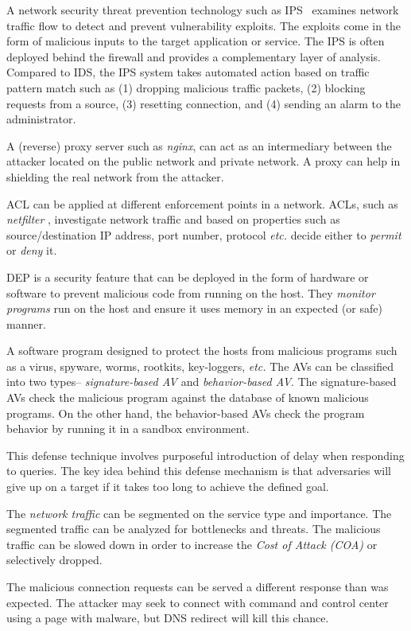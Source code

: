 A network security threat prevention technology such as IPS~ examines network traffic flow to detect and prevent vulnerability exploits. The exploits come in the form of malicious inputs to the target application or service. The IPS is often  deployed behind the firewall and provides a complementary layer of analysis. Compared to IDS, the IPS system takes automated action based on traffic pattern match such as (1) dropping malicious traffic packets, (2) blocking requests from a source, (3) resetting connection, and (4) sending an alarm to the administrator.

A (reverse) proxy server such as \emph{nginx}, can act as an intermediary between the attacker located on the public network and private network. A proxy can help in shielding the real network from the attacker.

ACL can be applied at different enforcement points in a network. ACLs, such as \emph{netfilter} , investigate network traffic and based on properties such as source/destination IP address, port number, protocol {\em etc.} decide either to \emph{permit} or \emph{deny} it.

DEP is a security feature that can be deployed in the form of hardware or software to prevent malicious code from running on the host. They \emph{monitor programs} run on the host and ensure it uses memory in an expected (or safe) manner.

A software program designed to protect the hosts from malicious programs such as a virus, spyware, worms, rootkits, key-loggers, {\em etc.} The AVs can be classified into two types-- \emph{signature-based AV} and \emph{behavior-based AV}. The signature-based AVs check the malicious program against the database of known malicious programs. On the other hand, the behavior-based AVs check the program behavior by running it in a sandbox environment.

This defense technique involves purposeful introduction of delay when responding to queries. The key idea behind this defense mechanism is that adversaries will give up on a target if it takes too long to achieve the defined goal.

The \emph{network traffic} can be segmented on the service type and importance. The segmented traffic can be analyzed for bottlenecks and threats. The malicious traffic can be slowed down in order to increase the \emph{Cost of Attack (COA)} or selectively dropped.

The malicious connection requests can be served a different response than was expected. The attacker may seek to connect with command and control center using a page with malware, but DNS redirect will kill this chance.

